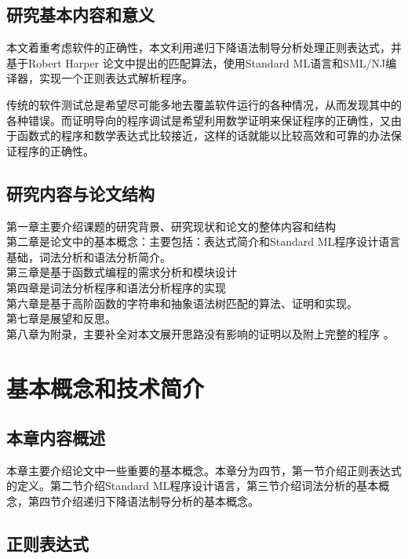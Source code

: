 \documentclass[openany,oneside]{book}
\theoremstyle{definition}
\theoremstyle{definition}
\begin{document}
\section{研究基本内容和意义}
	本文着重考虑软件的正确性，本文利用递归下降语法制导分析处理正则表达式，并基于Robert Harper 论文\cite{harper1999proof}中提出的匹配算法，使用Standard ML语言和SML/NJ编译器，实现一个正则表达式解析程序。
	
	传统的软件测试总是希望尽可能多地去覆盖软件运行的各种情况，从而发现其中的各种错误。而证明导向的程序调试是希望利用数学证明来保证程序的正确性，又由于函数式的程序和数学表达式比较接近，这样的话就能以比较高效和可靠的办法保证程序的正确性。

\section{研究内容与论文结构}

	\indent 第一章主要介绍课题的研究背景、研究现状和论文的整体内容和结构\\
	\indent 第二章是论文中的基本概念：主要包括：表达式简介和Standard ML程序设计语言基础，词法分析和语法分析简介。\\
	\indent 第三章是基于函数式编程的需求分析和模块设计\\
	\indent 第四章是词法分析程序和语法分析程序的实现\\
	\indent 第六章是基于高阶函数的字符串和抽象语法树匹配的算法、证明和实现。\\
	\indent 第七章是展望和反思。\\
	\indent 第八章为附录，主要补全对本文展开思路没有影响的证明以及附上完整的程序  。



\chapter{基本概念和技术简介}
\section{本章内容概述}
	本章主要介绍论文中一些重要的基本概念。本章分为四节，第一节介绍正则表达式的定义。第二节介绍Standard ML程序设计语言，第三节介绍词法分析的基本概念，第四节介绍递归下降语法制导分析的基本概念。
\section{正则表达式}
\end{document}
